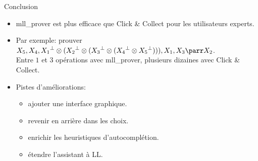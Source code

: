 \documentclass{beamer}
\newcommand*{\orth}{^\perp}
\newcommand*{\tensor}{\otimes}
\begin{document}
\begin{frame}{Conclusion}
    \begin{itemize}
        \item mll\_prover est plus efficace que Click \& Collect pour les utilisateurs experts.
            \pause
        \item Par exemple: prouver $X_5, X_4, {X_1}\orth \tensor ({X_2}\orth \tensor ({X_3}\orth \tensor ({X_4}\orth \tensor {X_5}\orth))), X_1, X_3 \parr X_2$.\\
        Entre $1$ et $3$ opérations avec mll\_prover, plusieurs dizaines avec Click \& Collect.
            \pause
        \item Pistes d'améliorations:
            \begin{itemize}
                \item ajouter une interface graphique.
                \item revenir en arrière dans les choix.
                \item enrichir les heuristiques d'autocomplétion.
                \item étendre l'assistant à LL.
            \end{itemize}
    \end{itemize}
\end{frame}
\end{document}
